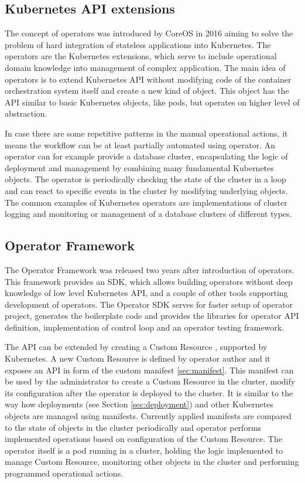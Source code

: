 \documentclass[
  digital, %
  twoside, %
  table,   %
  lof,     %
  lot,     %
]{fithesis3}
\begin{document}
\subsection{Kubernetes API extensions}
The concept of operators \cite{kubernetes-operator} was introduced by CoreOS \cite{operators} in 2016 aiming to solve the problem of hard integration of stateless applications into Kubernetes. The operators  are the Kubernetes extensions, which serve to include operational domain knowledge into management of complex application. The main idea of operators is to extend Kubernetes API without modifying code of the container orchestration system itself and create a new kind of object. This object has the API similar to basic Kubernetes objects, like pods, but operates on higher level of abstraction.

In case there are some repetitive patterns in the manual operational actions, it means the workflow can be at least partially automated using operator. An operator can for example provide a database cluster, encapsulating the logic of deployment and management by combining many fundamental Kubernetes objects. The operator is periodically checking the state of the cluster in a loop and can react to specific events in the cluster by modifying underlying objects. The common examples of Kubernetes operators are implementations of cluster logging and monitoring or management of a database clusters of different types.

\subsection{Operator Framework} \label{sec:operator_framework}
The Operator Framework \cite{operator-framework} was released two years after introduction of operators. This framework provides an SDK, which allows building operators without deep knowledge of low level Kubernetes API, and a couple of other tools supporting development of operators. The Operator SDK serves for faster setup of operator project, generates the boilerplate code and provides the libraries for operator API definition, implementation of control loop and an operator testing framework.

The API can be extended by creating a Custom Resource \cite{custom-resources}, supported by Kubernetes. A new Custom Resource is defined by operator author and it exposes an API in form of the custom manifest \ref{sec:manifest}. This manifest can be used by the administrator to create a Custom Resource in the cluster, modify its configuration after the operator is deployed to the cluster. It is similar to the way how deployments (see Section \ref{sec:deployment}) and other Kubernetes objects are managed using manifests. Currently applied manifests are compared to the state of objects in the cluster periodically and operator performs implemented operations based on configuration of the Custom Resource. The operator itself is a pod running in a cluster, holding the logic implemented to manage Custom Resource, monitoring other objects in the cluster and performing programmed operational actions.
\end{document}
